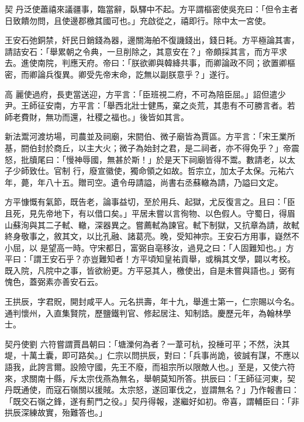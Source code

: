 \begin{pinyinscope}
 契
 丹泛使蕭禧來議疆事，臨當辭，臥驛中不起。方平謂樞密使吳充曰：「但令主者日致饋勿問，且使邊郡檄其國可也。」充啟從之，禧即行。除中太一宮使。



 王安石弛銅禁，奸民日銷錢為器，邊關海舶不復譏錢出，錢日耗。方平極論其害，請詰安石：「舉累朝之令典，一旦削除之，其意安在？」帝頗採其言，而方平求去。進使南院，判應天府。帝曰：「朕欲卿與韓絳共事，而卿論政不同；欲置卿樞密，而卿論兵復異。卿受先帝末命，訖無以副朕意乎？」遂行。



 高
 麗使過府，長吏當送迎，方平言：「臣班視二府，不可為陪臣屈。」詔但遣少尹。王師征安南，方平言：「舉西北壯士健馬，棄之炎荒，其患有不可勝言者。若師老費財，無功而還，社稷之福也。」後皆如其言。



 新法鬻河渡坊場，司農並及祠廟，宋閼伯、微子廟皆為賈區。方平言：「宋王業所基，閼伯封於商丘，以主大火；微子為始封之君，是二祠者，亦不得免乎？」帝震怒，批牘尾曰：「慢神辱國，無甚於斯！」於是天下祠廟皆得不鬻。數請老，以太子少師致仕。官制
 行，廢宣徽使，獨命領之如故。哲宗立，加太子太保。元祐六年，薨，年八十五。贈司空。遺令毋請謚，尚書右丞蘇轍為請，乃謚曰文定。



 方平慷慨有氣節，既告老，論事益切，至於用兵、起獄，尤反復言之。且曰：「臣且死，見先帝地下，有以借口矣。」平居未嘗以言徇物、以色假人。守蜀日，得眉山蘇洵與其二子軾、轍，深器異之。嘗薦軾為諫官。軾下制獄，又抗章為請，故軾終身敬事之，敘其文，以比孔融、諸葛亮。晚，受知神宗。王安石方用事，嶷然不小屈，以
 是望高一時。守宋都日，富弼自亳移汝，過見之曰：「人固難知也。」方平曰：「謂王安石乎？亦豈難知者！方平頃知皇祐貢舉，或稱其文學，闢以考校。既入院，凡院中之事，皆欲紛更。方平惡其人，檄使出，自是未嘗與語也。」弼有愧色，蓋弼素亦善安石云。



 王拱辰，字君貺，開封咸平人。元名拱壽，年十九，舉進士第一，仁宗賜以今名。通判懷州，入直集賢院，歷鹽鐵判官、修起居注、知制誥。慶歷元年，為翰林學士。



 契丹使劉
 六符嘗謂賈昌朝曰：「塘濼何為者？一葦可杭，投棰可平；不然，決其堤，十萬土囊，即可路矣。」仁宗以問拱辰，對曰：「兵事尚詭，彼誠有謀，不應以語我，此誇言爾。設險守國，先王不廢，而祖宗所以限敵人也。」至是，又使六符來，求關南十縣，斥太宗伐燕為無名，舉朝莫知所答。拱辰曰：「王師征河東，契丹既通使，而寇石嶺關以援賊。太宗怒，遂回軍伐之，豈謂無名？」乃作報書曰：「既交石嶺之鋒，遂有薊門之役。」契丹得報，遂繼好如初。帝喜，謂輔臣曰：「非
 拱辰深練故實，殆難答也。」




\end{pinyinscope}
